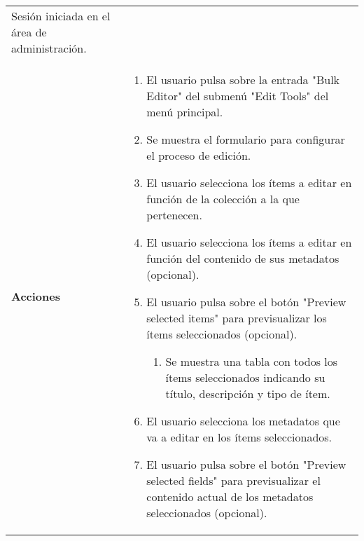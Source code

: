 \begin{longtable}[]{@{}ll@{}}
\begin{minipage}[t]{0.79\columnwidth}
Sesión iniciada en el área de administración.\strut
\end{minipage}\tabularnewline
\begin{minipage}[t]{0.15\columnwidth}\raggedright
\textbf{Acciones}\strut
\end{minipage} & \begin{minipage}[t]{0.79\columnwidth}\raggedright
\begin{enumerate}
\def\labelenumi{\arabic{enumi}.}
\tightlist
\item
  El usuario pulsa sobre la entrada "Bulk Editor" del submenú "Edit
  Tools" del menú principal.
\item
  Se muestra el formulario para configurar el proceso de edición.
\item
  El usuario selecciona los ítems a editar en función de la colección a
  la que pertenecen.
\item
  El usuario selecciona los ítems a editar en función del contenido de
  sus metadatos (opcional).
\item
  El usuario pulsa sobre el botón "Preview selected items" para
  previsualizar los ítems seleccionados (opcional).

  \begin{enumerate}
  \def\labelenumii{\alph{enumii}.}
  \tightlist
  \item
    Se muestra una tabla con todos los ítems seleccionados indicando su
    título, descripción y tipo de ítem.
  \end{enumerate}
\item
  El usuario selecciona los metadatos que va a editar en los ítems
  seleccionados.
\item
  El usuario pulsa sobre el botón "Preview selected fields" para
  previsualizar el contenido actual de los metadatos seleccionados
  (opcional).


\end{enumerate}
\end{minipage}
\end{longtable}
